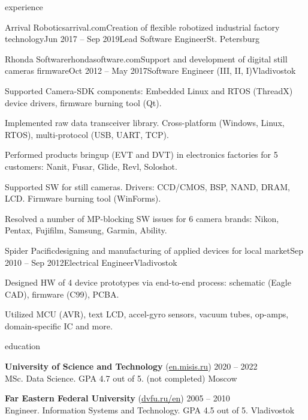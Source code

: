 \documentclass{Vladimir.Ivanov.CV}
\begin{document}
\begin{rSection}{experience}
\begin{rCompany}{Arrival Robotics}{arrival.com}{Creation of flexible robotized industrial factory technology}{Jun 2017 -- Sep 2019}{Lead Software Engineer}{St. Petersburg}
\end{rCompany}
\begin{rCompany}{Rhonda Software}{rhondasoftware.com}{Support and development of digital still cameras firmware}{Oct 2012 -- May 2017}{Software Engineer (III, II, I)}{Vladivostok}

\item Supported Camera-SDK components: Embedded Linux and RTOS (ThreadX) device drivers, firmware burning tool (Qt).
\item Implemented raw data transceiver library. Cross-platform (Windows, Linux, RTOS), multi-protocol (USB, UART, TCP).
\item Performed products bringup (EVT and DVT) in electronics factories for 5 customers: Nanit, Fusar, Glide, Revl, Soloshot.
\item Supported SW for still cameras. Drivers: CCD/CMOS, BSP, NAND, DRAM, LCD. Firmware burning tool (WinForms).
\item Resolved a number of MP-blocking SW issues for 6 camera brands: Nikon, Pentax, Fujifilm, Samsung, Garmin, Ability.

\end{rCompany}
\begin{rCompany}{Spider Pacific}{}{designing and manufacturing of applied devices for local market}{Sep 2010 -- Sep 2012}{Electrical Engineer}{Vladivostok}

\item Designed HW of 4 device prototypes via end-to-end process: schematic (Eagle CAD), firmware (C99), PCBA.
\item Utilized MCU (AVR), text LCD, accel-gyro sensors, vacuum tubes, op-amps, domain-specific IC and more.

\end{rCompany}
\end{rSection}

\begin{rSection}{education}

{\bf University of Science and Technology } {(\href{https://en.misis.ru}{en.misis.ru})} \hfill {2020 -- 2022} \\
MSc. Data Science. GPA 4.7 out of 5. (not completed) \hfill {Moscow}

{\bf Far Eastern Federal University} {(\href{https://www.dvfu.ru/en}{dvfu.ru/en})} \hfill {2005 -- 2010} \\
Engineer. Information Systems and Technology. GPA 4.5 out of 5. \hfill {Vladivostok}

\end{rSection}
\end{document}
